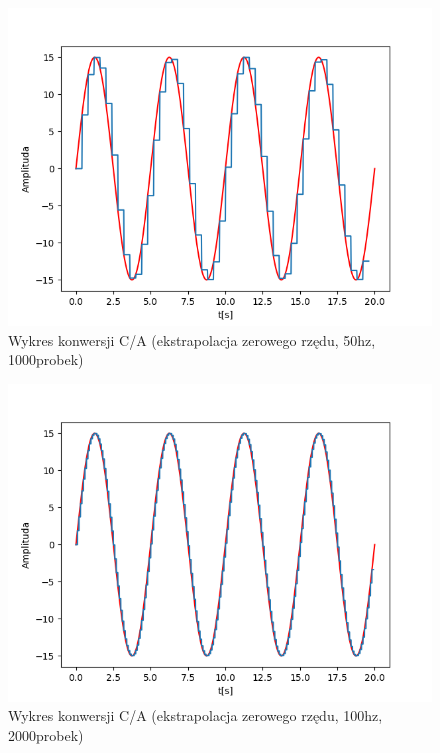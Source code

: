 \documentclass[12pt]{article}
\begin{document}
\begin{figure}[H]
\centering
\includegraphics[scale=0.6]{2sinusEkstrapol0rzedu50.png}
\caption{Wykres konwersji C/A (ekstrapolacja zerowego rzędu, 50hz, 1000probek)}
\end{figure}

\begin{figure}[H]
\centering
\includegraphics[scale=0.6]{2sinusEkstrapol0rzedu.png}
\caption{Wykres konwersji C/A (ekstrapolacja zerowego rzędu, 100hz, 2000probek)}
\end{figure}
\end{document}
